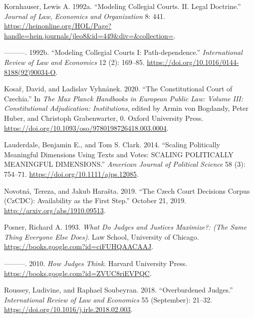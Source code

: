 \documentclass[
  11pt,
]{article}
\newlength{\cslhangindent}
\newenvironment{CSLReferences}[2] %
 {%
  \setlength{\parindent}{0pt}
  \ifodd #1 \everypar{\setlength{\hangindent}{\cslhangindent}}\ignorespaces\fi
  \ifnum #2 > 0
  \setlength{\parskip}{#2\baselineskip}
  \fi
 }%
 {}
\begin{document}
\begin{CSLReferences}{1}{0}
\leavevmode{}%
Kornhauser, Lewis A. 1992a. {``Modeling {Collegial Courts}. {II}. {Legal
Doctrine}.''} \emph{Journal of Law, Economics and Organization} 8: 441.
\url{https://heinonline.org/HOL/Page?handle=hein.journals/jleo8&id=449&div=&collection=}.

\leavevmode{}%
---------. 1992b. {``Modeling Collegial Courts {I}:
{Path-dependence}.''} \emph{International Review of Law and Economics}
12 (2): 169--85. \url{https://doi.org/10.1016/0144-8188(92)90034-O}.

\leavevmode{}%
Kosař, David, and Ladislav Vyhnánek. 2020. {``The {Constitutional Court}
of {Czechia}.''} In \emph{The {Max Planck Handbooks} in {European Public
Law}: {Volume III}: {Constitutional Adjudication}: {Institutions}},
edited by Armin von Bogdandy, Peter Huber, and Christoph Grabenwarter,
0. {Oxford University Press}.
\url{https://doi.org/10.1093/oso/9780198726418.003.0004}.

\leavevmode{}%
Lauderdale, Benjamin E., and Tom S. Clark. 2014. {``Scaling {Politically
Meaningful Dimensions Using Texts} and {Votes}: {SCALING POLITICALLY
MEANINGFUL DIMENSIONS}.''} \emph{American Journal of Political Science}
58 (3): 754--71. \url{https://doi.org/10.1111/ajps.12085}.

\leavevmode{}%
Novotná, Tereza, and Jakub Harašta. 2019. {``The {Czech Court Decisions
Corpus} ({CzCDC}): {Availability} as the {First Step}.''} October 21,
2019. \url{http://arxiv.org/abs/1910.09513}.

\leavevmode{}%
Posner, Richard A. 1993. \emph{What {Do Judges} and {Justices
Maximize}?: (The {Same Thing Everyone Else Does})}. {Law School,
University of Chicago}. \url{https://books.google.com?id=ciFUHQAACAAJ}.

\leavevmode{}%
---------. 2010. \emph{How {Judges Think}}. {Harvard University Press}.
\url{https://books.google.com?id=ZVUC8riEVPQC}.

\leavevmode{}%
Roussey, Ludivine, and Raphael Soubeyran. 2018. {``Overburdened
Judges.''} \emph{International Review of Law and Economics} 55
(September): 21--32. \url{https://doi.org/10.1016/j.irle.2018.02.003}.


\end{CSLReferences}
\end{document}
